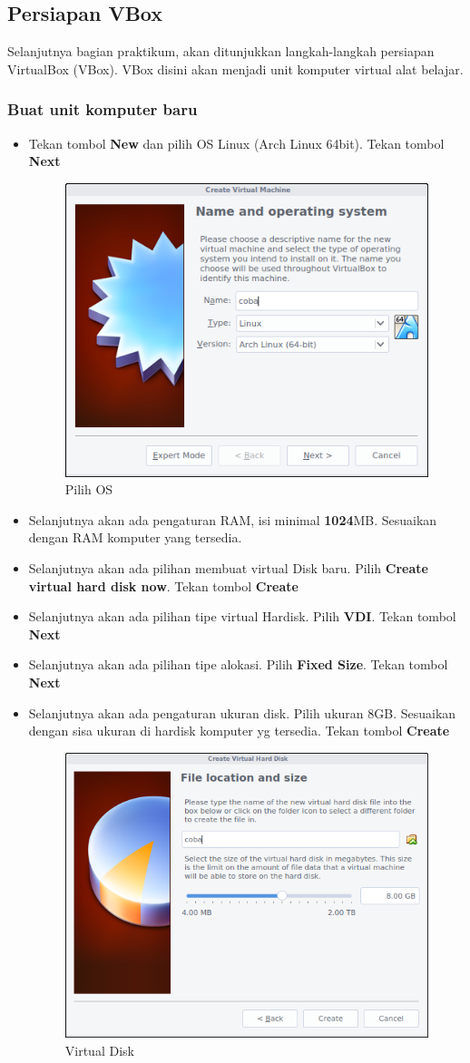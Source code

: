 \documentclass[12pt,]{article}
\begin{document}
	\subsection{Persiapan VBox}
	Selanjutnya bagian praktikum, akan ditunjukkan langkah-langkah persiapan VirtualBox (VBox).
	VBox disini akan menjadi unit komputer virtual alat belajar.
	
	\subsubsection{Buat unit komputer baru}
	\begin{itemize}
		\item Tekan tombol \textbf{New} dan pilih OS Linux (Arch Linux 64bit).
		Tekan tombol \textbf{Next}
		\begin{figure}[H]
			\centering
			\includegraphics[width=0.4\linewidth]{images/vbox_installinux/s1}
			\caption{Pilih OS}
		\end{figure}
	
		\item Selanjutnya akan ada pengaturan RAM, isi minimal \textbf{1024}MB.
		Sesuaikan dengan RAM komputer yang tersedia.
		
		\item Selanjutnya akan ada pilihan membuat virtual Disk baru.
		Pilih \textbf{Create virtual hard disk now}.
		Tekan tombol \textbf{Create}
		
		\item Selanjutnya akan ada pilihan tipe virtual Hardisk.
		Pilih \textbf{VDI}. Tekan tombol \textbf{Next}
		
		\item Selanjutnya akan ada pilihan tipe alokasi.
		Pilih \textbf{Fixed Size}.
		Tekan tombol \textbf{Next}
		
		\item Selanjutnya akan ada pengaturan ukuran disk.
		Pilih ukuran 8GB. Sesuaikan dengan sisa ukuran di hardisk komputer yg tersedia.
		Tekan tombol \textbf{Create}
		\begin{figure}[H]
			\centering
			\includegraphics[width=0.4\linewidth]{images/vbox_installinux/s2}
			\caption{Virtual Disk}
		\end{figure}
	\end{itemize}
	
\end{document}
